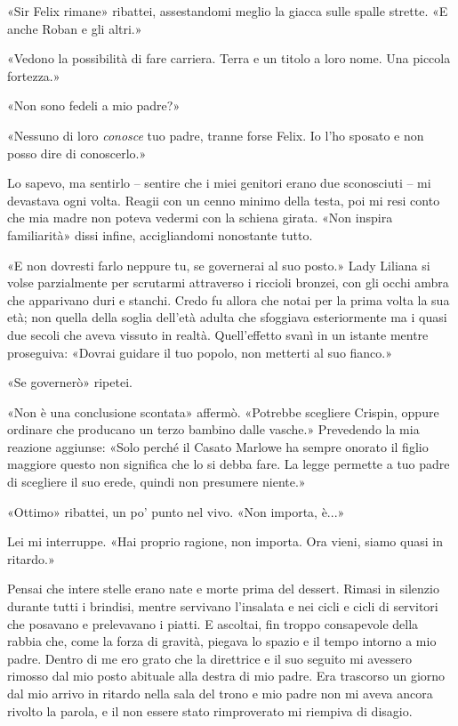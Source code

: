 «Sir Felix rimane» ribattei, assestandomi meglio la giacca sulle spalle
strette. «E anche Roban e gli altri.»

«Vedono la possibilità di fare carriera. Terra e un titolo a loro nome.
Una piccola fortezza.»

«Non sono fedeli a mio padre?»

«Nessuno di loro \emph{conosce} tuo padre, tranne forse Felix. Io l'ho
sposato e non posso dire di conoscerlo.»

Lo sapevo, ma sentirlo -- sentire che i miei genitori erano due
sconosciuti -- mi devastava ogni volta. Reagii con un cenno minimo della
testa, poi mi resi conto che mia madre non poteva vedermi con la schiena
girata. «Non inspira familiarità» dissi infine, accigliandomi nonostante
tutto.

«E non dovresti farlo neppure tu, se governerai al suo posto.» Lady
Liliana si volse parzialmente per scrutarmi attraverso i riccioli
bronzei, con gli occhi ambra che apparivano duri e stanchi. Credo fu
allora che notai per la prima volta la sua età; non quella della soglia
dell'età adulta che sfoggiava esteriormente ma i quasi due secoli che
aveva vissuto in realtà. Quell'effetto svanì in un istante mentre
proseguiva: «Dovrai guidare il tuo popolo, non metterti al suo fianco.»

«Se governerò» ripetei.

«Non è una conclusione scontata» affermò. «Potrebbe scegliere Crispin,
oppure ordinare che producano un terzo bambino dalle vasche.» Prevedendo
la mia reazione aggiunse: «Solo perché il Casato Marlowe ha sempre
onorato il figlio maggiore questo non significa che lo si debba fare. La
legge permette a tuo padre di scegliere il suo erede, quindi non
presumere niente.»

«Ottimo» ribattei, un po' punto nel vivo. «Non importa, è...»

Lei mi interruppe. «Hai proprio ragione, non importa. Ora vieni, siamo
quasi in ritardo.»

\begin{figure}
	\centering
	\def\svgwidth{\columnwidth}
	\scalebox{0.2}{}
\end{figure}

Pensai che intere stelle erano nate e morte prima del dessert. Rimasi in
silenzio durante tutti i brindisi, mentre servivano l'insalata e nei
cicli e cicli di servitori che posavano e prelevavano i piatti. E
ascoltai, fin troppo consapevole della rabbia che, come la forza di
gravità, piegava lo spazio e il tempo intorno a mio padre. Dentro di me
ero grato che la direttrice e il suo seguito mi avessero rimosso dal mio
posto abituale alla destra di mio padre. Era trascorso un giorno dal mio
arrivo in ritardo nella sala del trono e mio padre non mi aveva ancora
rivolto la parola, e il non essere stato rimproverato mi riempiva di
disagio.

